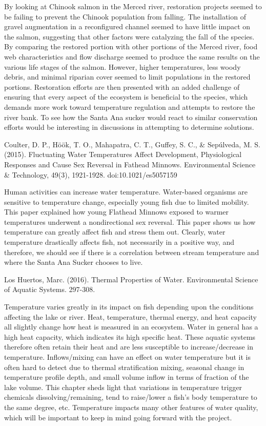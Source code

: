 \documentclass{article}\usepackage[]{graphicx}\usepackage[]{color}
\begin{document}
By looking at Chinook salmon in the Merced river, restoration projects seemed to be failing to prevent the Chinook population from falling. The installation of gravel augmentation in a reconfigured channel seemed to have little impact on the salmon, suggesting that other factors were catalyzing the fall of the species. By comparing the restored portion with other portions of the Merced river, food web characteristics and flow discharge seemed to produce the same results on the various life stages of the salmon. However, higher temperatures, less woody debris, and minimal riparian cover seemed to limit populations in the restored portions. Restoration efforts are then presented with an added challenge of ensuring that every aspect of the ecosystem is beneficial to the species, which demands more work toward temperature regulation and attempts to restore the river bank. To see how the Santa Ana sucker would react to similar conservation efforts would be interesting in discussions in attempting to determine solutions. 

Coulter, D. P., Höök, T. O., Mahapatra, C. T., Guffey, S. C., \& Sepúlveda, M. S. (2015). Fluctuating Water Temperatures Affect Development, Physiological Responses and Cause Sex Reversal in Fathead Minnows. Environmental Science \& Technology, 49(3), 1921-1928. doi:10.1021/es5057159

Human activities can increase water temperature. Water-based organisms are sensitive to temperature change, especially young fish due to limited mobility. This paper explained how young Flathead Minnows exposed to warmer temperatures underwent a nondirectional sex reversal. This paper shows us how temperature can greatly affect fish and stress them out. Clearly, water temperature drastically affects fish, not necessarily in a positive way, and therefore, we should see if there is a correlation between stream temperature and where the Santa Ana Sucker chooses to live.

Los Huertos, Marc. (2016). Thermal Properties of Water. Environmental Science of Aquatic Systems. 297-308.

Temperature varies greatly in its impact on fish depending upon the conditions affecting the lake or river. Heat, temperature, thermal energy, and heat capacity all slightly change how heat is measured in an ecosystem. Water in general has a high heat capacity, which indicates its high specific heat. These aquatic systems therefore often retain their heat and are less susceptible to increase/decrease in temperature. Inflows/mixing can have an effect on water temperature but it is often hard to detect due to thermal stratification mixing, seasonal change in temperature profile depth, and small volume inflow in terms of fraction of the lake volume. This chapter sheds light that variations in temperature trigger chemicals dissolving/remaining, tend to raise/lower a fish’s body temperature to the same degree, etc. Temperature impacts many other features of water quality, which will be important to keep in mind going forward with the project.
\end{document}
